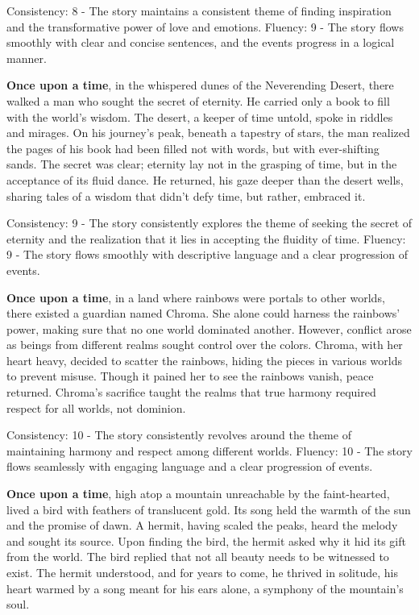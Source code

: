 \documentclass{article}
\begin{document}
Consistency: 8 - The story maintains a consistent theme of finding inspiration and the transformative power of love and emotions.
Fluency: 9 - The story flows smoothly with clear and concise sentences, and the events progress in a logical manner.

\textbf{Once upon a time}, in the whispered dunes of the Neverending Desert, there walked a man who sought the secret of eternity. He carried only a book to fill with the world's wisdom. The desert, a keeper of time untold, spoke in riddles and mirages. On his journey's peak, beneath a tapestry of stars, the man realized the pages of his book had been filled not with words, but with ever-shifting sands. The secret was clear; eternity lay not in the grasping of time, but in the acceptance of its fluid dance. He returned, his gaze deeper than the desert wells, sharing tales of a wisdom that didn’t defy time, but rather, embraced it.

Consistency: 9 - The story consistently explores the theme of seeking the secret of eternity and the realization that it lies in accepting the fluidity of time.
Fluency: 9 - The story flows smoothly with descriptive language and a clear progression of events.

\textbf{Once upon a time}, in a land where rainbows were portals to other worlds, there existed a guardian named Chroma. She alone could harness the rainbows' power, making sure that no one world dominated another. However, conflict arose as beings from different realms sought control over the colors. Chroma, with her heart heavy, decided to scatter the rainbows, hiding the pieces in various worlds to prevent misuse. Though it pained her to see the rainbows vanish, peace returned. Chroma's sacrifice taught the realms that true harmony required respect for all worlds, not dominion.

Consistency: 10 - The story consistently revolves around the theme of maintaining harmony and respect among different worlds.
Fluency: 10 - The story flows seamlessly with engaging language and a clear progression of events.

\textbf{Once upon a time}, high atop a mountain unreachable by the faint-hearted, lived a bird with feathers of translucent gold. Its song held the warmth of the sun and the promise of dawn. A hermit, having scaled the peaks, heard the melody and sought its source. Upon finding the bird, the hermit asked why it hid its gift from the world. The bird replied that not all beauty needs to be witnessed to exist. The hermit understood, and for years to come, he thrived in solitude, his heart warmed by a song meant for his ears alone, a symphony of the mountain's soul.
\end{document}
